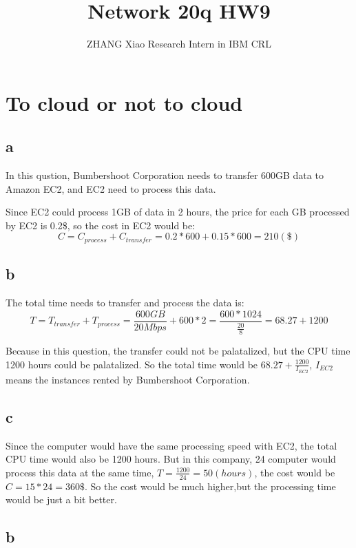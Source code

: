 \documentclass[12pt,a4paper]{article}
\author{ZHANG Xiao Research Intern in IBM CRL}
\title{Network 20q HW9}
\begin{document}
\maketitle
\pagebreak

\section{To cloud or not to cloud}
\subsection{a}
In this qustion, Bumbershoot Corporation needs to transfer 600GB data to Amazon EC2, and EC2 need to process this data.

Since EC2 could process 1GB of data in 2 hours, the price for each GB processed by EC2 is 0.2\$, so the cost in EC2 would be:
\begin{equation}
C = C_{process} + C_{transfer} = 0.2 * 600 + 0.15 * 600 = 210 (\$)
\end{equation}

\subsection{b}
The total time needs to transfer and process the data is:
\begin{equation}
T = T_{transfer} + T_{process} = \frac{600GB}{20Mbps} + 600 * 2 = \frac{600*1024}{\frac{20}{8}} = 68.27 + 1200
\end{equation}

Because in this question, the transfer could not be palatalized, but the CPU time 1200 hours could be palatalized. So the total time would be $68.27 + \frac{1200}{I_{EC2}} $, $I_{EC2}$ means the instances rented by Bumbershoot Corporation.

\subsection{c}

Since the computer would have the same processing speed with EC2, the total CPU time would also be 1200 hours. But in this company, 24 computer would process this data at the same time, $T = \frac{1200}{24} = 50 (hours)$, the cost would be $C = 15 * 24 = 360 \$$. So the cost would be much higher,but the processing  time would be just a bit better.

\subsection{b}
\end{document}
